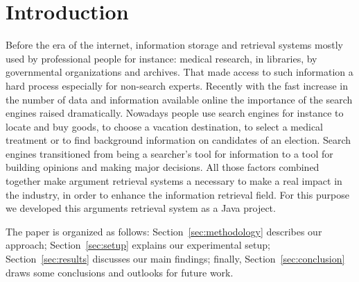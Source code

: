 \section{Introduction}
\label{sec:introduction}

Before the era of the internet, information storage and retrieval systems mostly used by professional people for instance: medical research, in libraries, by governmental organizations and archives. That made access to such information a hard process especially for non-search experts. Recently with the fast increase in the number of data and information available online the importance of the search engines raised dramatically. Nowadays people use search engines for instance to locate and buy goods, to choose a vacation destination, to select a medical treatment or to find background information on candidates of an election. Search engines transitioned from being a searcher's tool for information to a tool for building opinions and making major decisions. All those factors combined together make argument retrieval systems a necessary to make a real impact in the industry, in order to enhance the information retrieval field. For this purpose we developed this arguments retrieval system as a Java project.


The paper is organized as follows: Section~\ref{sec:methodology} describes our approach; Section~\ref{sec:setup} explains our experimental setup; Section~\ref{sec:results} discusses our main findings; finally, Section~\ref{sec:conclusion} draws some conclusions and outlooks for future work.